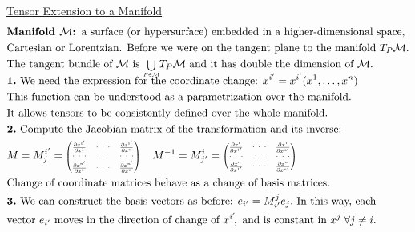 \underline{Tensor Extension to a Manifold}
\begin{align*}
&\textbf{Manifold $\mathcal{M}$: } \text{a surface (or hypersurface) embedded in a higher-dimensional space,} \\
&\text{Cartesian or Lorentzian. Before we were on the tangent plane to the manifold $T_P\mathcal{M}$.}\\
& \text{The tangent bundle of } \mathcal{M}\text{ is } \text{\scalebox{0.7}{$\displaystyle \bigcup_{P \in \mathcal{M}}$}} T_P\mathcal{M}
\text{ and it has double the dimension of } \mathcal{M}.  \\[-1.8ex]
&\textbf{1.} \text{ We need the expression for the coordinate change: } x^{i'} = x^{i'}(x^1, \dots, x^n) \\
&\text{This function can be understood as a parametrization over the manifold.} \\
&\text{It allows tensors to be consistently defined over the whole manifold.} \\
&\textbf{2.} \text{ Compute the Jacobian matrix of the transformation and its inverse:} \\
&M= M^{i'}_j  =
\scalebox{0.7}{$
\begin{pmatrix} 
\frac{\partial x^{1'}}{\partial x^1} &  \text{···} & \frac{\partial x^{1'}}{\partial x^n} \\
\!\! \text{···}\!\! & \! ^.\text{·}.\! & \!\! \text{···}\!\! \\ 
\frac{\partial x^{n'}}{\partial x^1} &  \text{···} & \frac{\partial x^{n'}}{\partial x^n} 
\end{pmatrix} $}
\;\;\;\;
M^{-1}= M^i_{j'}= 
\scalebox{0.7}{$
\begin{pmatrix} 
\frac{\partial x^1}{\partial x^{1'}} &  \text{···} & \frac{\partial x^1}{\partial x^{n'}} \\ 
\!\! \text{···} \!\!& \!^.\text{·}.\! \!& \!\! \text{···}\!\! \\ 
\frac{\partial x^n}{\partial x^{1'}} &  \text{···} & \frac{\partial x^n}{\partial x^{n'}} 
\end{pmatrix}$} \\
&\text{Change of coordinate matrices behave as a change of basis matrices.}\\
&\textbf{3.} \text{ We can construct the basis vectors as before: } 
e_{i'} = M^{j}_{i'} e_j. \text{ In this way, each} \\
& \text{vector } e_{i'} \text{ moves in the direction of change of } x^{i'}\!, 
\text{ and is constant in } x^{j} \; \forall j \neq i. \\

\end{align*}
